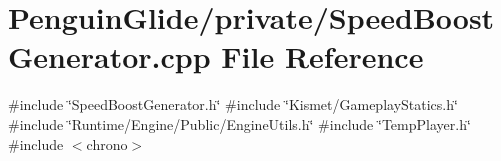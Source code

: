 \section{Penguin\+Glide/private/\+Speed\+Boost\+Generator.cpp File Reference}
\label{_speed_boost_generator_8cpp}
{\ttfamily \#include \char`\"{}Speed\+Boost\+Generator.\+h\char`\"{}}\newline
{\ttfamily \#include \char`\"{}Kismet/\+Gameplay\+Statics.\+h\char`\"{}}\newline
{\ttfamily \#include \char`\"{}Runtime/\+Engine/\+Public/\+Engine\+Utils.\+h\char`\"{}}\newline
{\ttfamily \#include \char`\"{}Temp\+Player.\+h\char`\"{}}\newline
{\ttfamily \#include $<$chrono$>$}\newline
